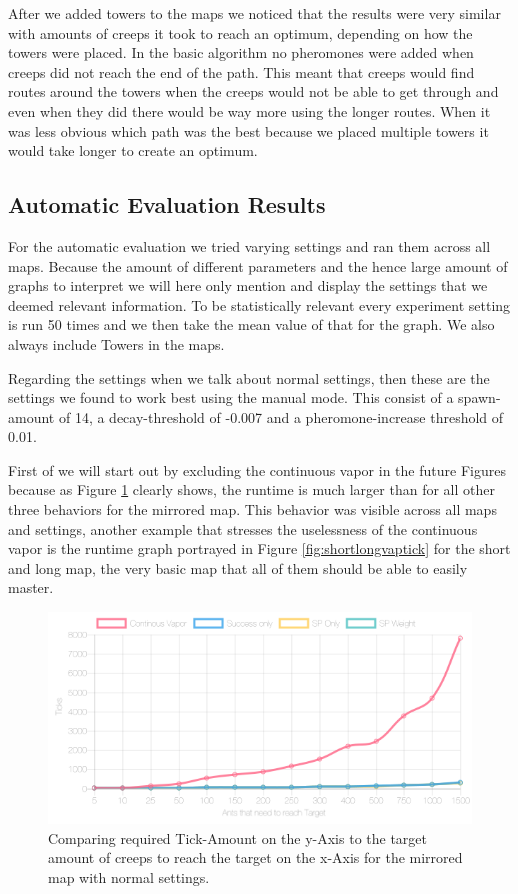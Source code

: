 After we added towers to the maps we noticed that the results were very similar with amounts of creeps it took to reach an optimum, depending on how the towers were placed. In the basic algorithm no pheromones were added when creeps did not reach the end of the path. This meant that creeps would find routes around the towers when the creeps would not be able to get through and even when they did there would be way more using the longer routes. When it was less obvious which path was the best because we placed multiple towers it would take longer to create an optimum.

\subsection{Automatic Evaluation Results}
\label{sec:autover}
For the automatic evaluation we tried varying settings and ran them across all maps. Because the amount of different parameters and the hence large amount of graphs to interpret we will here only mention and display the settings that we deemed relevant information. To be statistically relevant every experiment setting is run 50 times and we then take the mean value of that for the graph. We also always include Towers in the maps.

Regarding the settings when we talk about normal settings, then these are the settings we found to work best using the manual mode. This consist of a spawn-amount of 14, a decay-threshold of -0.007 and a pheromone-increase threshold of 0.01.

First of we will start out by excluding the continuous vapor in the future Figures because as Figure \ref{fig:mirrorvaptick} clearly shows, the runtime is much larger than for all other three behaviors for the mirrored map. This behavior was visible across all maps and settings, another example that stresses the uselessness of the continuous vapor is the runtime graph portrayed in Figure \ref{fig:shortlongvaptick} for the short and long map, the very basic map that all of them should be able to easily master.

\begin{figure}[H]
  \centering
  \includegraphics[width=1\linewidth]{images/normalmirroredwithtower-ticks-line}
  \caption{Comparing required Tick-Amount on the y-Axis to the target amount of creeps to reach the target on the x-Axis for the mirrored map with normal settings.}
  \label{fig:mirrorvaptick}
\end{figure}


